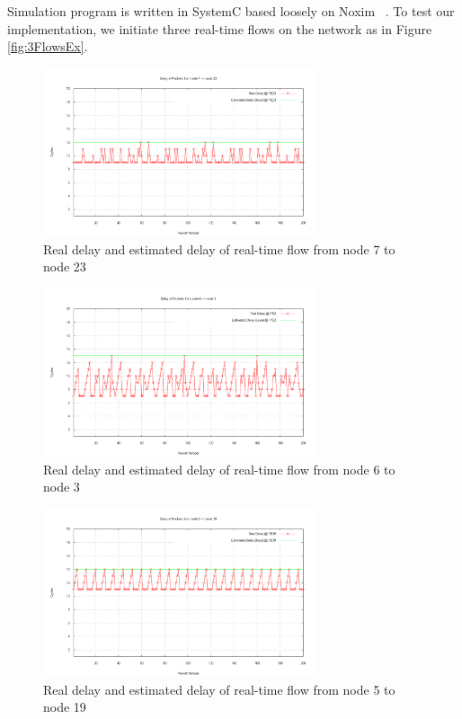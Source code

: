 \documentclass[conference, twocolumn]{IEEEtran}
\theoremstyle{definition}
\begin{document}
Simulation program is written in SystemC based loosely on Noxim ~\cite{Noxim}.
To test our implementation, we initiate three real-time flows on the network as
in Figure \ref{fig:3FlowsEx}.

\begin{figure}[htp]
\centering
\includegraphics[width=8cm]{pics/PE23.png}
\caption[Flow from node 7 to node 23.]
{Real delay and estimated delay of real-time flow from node
7 to node 23}\label{fig:PE7PE23}
\end{figure}

\begin{figure}[htp]
\centering
\includegraphics[width=8cm]{pics/PE3.png}
\caption[Three flows example.]
{Real delay and estimated delay of real-time flow from node
6 to node 3}\label{fig:PE6PE3}
\end{figure}

\begin{figure}[htp]
\centering
\includegraphics[width=8cm]{pics/PE19.png}
\caption[Three flows example.]
{Real delay and estimated delay of real-time flow from node
5 to node 19}\label{fig:PE5PE19}
\end{figure}
\end{document}
